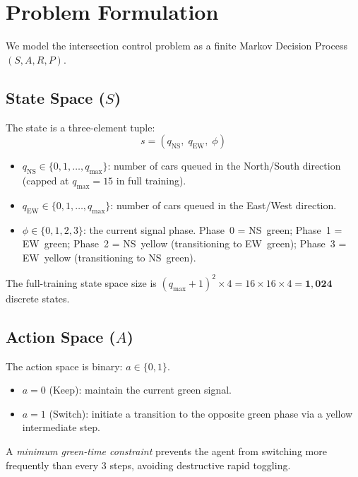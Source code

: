 \documentclass[12pt]{article}
\begin{document}
\section{Problem Formulation}

We model the intersection control problem as a finite Markov Decision Process
$(S, A, R, P)$.

\subsection{State Space ($S$)}
The state is a three-element tuple:
\[
    s = (q_\text{NS},\; q_\text{EW},\; \phi)
\]
\begin{itemize}[noitemsep]
    \item $q_\text{NS} \in \{0, 1, \ldots, q_\text{max}\}$: number of cars queued in
          the North/South direction (capped at $q_\text{max}=15$ in full training).
    \item $q_\text{EW} \in \{0, 1, \ldots, q_\text{max}\}$: number of cars queued in
          the East/West direction.
    \item $\phi \in \{0, 1, 2, 3\}$: the current signal phase.
          Phase~0 = NS~green; Phase~1 = EW~green; Phase~2 = NS~yellow (transitioning
          to EW~green); Phase~3 = EW~yellow (transitioning to NS~green).
\end{itemize}
The full-training state space size is $(q_\text{max}+1)^2 \times 4 = 16 \times 16
\times 4 = \mathbf{1{,}024}$ discrete states.

\subsection{Action Space ($A$)}
The action space is binary: $a \in \{0, 1\}$.
\begin{itemize}[noitemsep]
    \item $a = 0$ (Keep): maintain the current green signal.
    \item $a = 1$ (Switch): initiate a transition to the opposite green phase via a
          yellow intermediate step.
\end{itemize}
A \emph{minimum green-time constraint} prevents the agent from switching more
frequently than every 3 steps, avoiding destructive rapid toggling.
\end{document}
